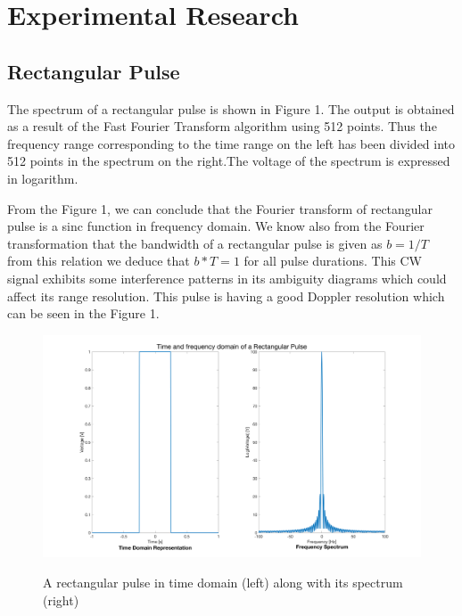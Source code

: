\chapter*{Experimental Research}

\section*{ Rectangular Pulse } 
\noindent The spectrum of a rectangular pulse is shown in Figure 1. The output is obtained as a result of the Fast Fourier Transform algorithm using 512 points. Thus the frequency range corresponding to the time range on the left has been divided into 512 points in the spectrum on the right.The voltage of the spectrum is expressed in logarithm.

\noindent From the Figure 1, we can conclude that the Fourier transform of rectangular pulse is a sinc function in frequency domain. We know also from the Fourier transformation that the bandwidth of a rectangular pulse is given as $b = 1/T$ from this relation we deduce that $b*T = 1$ for all pulse durations. This CW signal exhibits some interference patterns in its ambiguity diagrams which could affect its range resolution. This pulse is having a good Doppler resolution which can be seen in the Figure 1.

\begin{figure}[H]
\centering
{\includegraphics[scale=0.18]{usp8_1.png}}
\caption{ A rectangular pulse in time domain (left) along with its spectrum (right)}
\end{figure}

